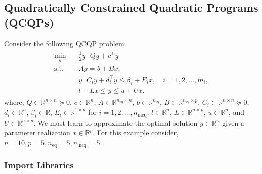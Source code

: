 \documentclass[letterpaper,10pt,english,openany,oneside]{sphinxmanual}
\begin{document}
\sphinxstepscope


\subsection{Quadratically Constrained Quadratic Programs (QCQPs)}
\label{\detokenize{examples/02_Example_QCQP:quadratically-constrained-quadratic-programs-qcqps}}\label{\detokenize{examples/02_Example_QCQP::doc}}
\sphinxAtStartPar
Consider the following QCQP problem:
\begin{equation*}
\begin{split}\begin{aligned}
\min_{y} \quad & \frac{1}{2} y^\top Q y + c^\top y \\
\text{s.t.} \quad
& A y = b + B x, \\
& y^\top C_i y + d_i^\top y \leq \beta_i + E_i x, \quad i = 1, 2, \ldots, m_i, \\
& l + L x \leq y \leq u + U x.
\end{aligned}\end{split}
\end{equation*}
\sphinxAtStartPar
where, \(Q \in \mathbb{R}^{n \times n} \succeq 0\), \(c \in \mathbb{R}^n\), \(A \in \mathbb{R}^{n_{\mathrm{eq}} \times n}\), \(b \in \mathbb{R}^{n_{\mathrm{eq}}}\), \(B \in \mathbb{R}^{n_{\mathrm{eq}} \times p }\), \(C_i \in \mathbb{R}^{n \times n} \succeq 0\), \(d_i \in \mathbb{R}^n\), \(\beta_i \in \mathbb{R}\), \(E_i \in \mathbb{R}^{1 \times p}\) for \(i = 1, 2, \ldots, n_{\mathrm{ineq}}\), \(l \in \mathbb{R}^n\), \(L \in \mathbb{R}^{n \times p}\), \(u \in \mathbb{R}^n\), and \(U \in \mathbb{R}^{n \times p}\). We must learn to approximate the optimal solution \(y \in \mathbb{R}^n\) given a parameter realization \(x \in \mathbb{R}^p\). For this example consider, \(n=10, p=5,n_\textrm{eq}=5,n_\textrm{ineq}=5\).


\subsubsection{Import Libraries}
\label{\detokenize{examples/02_Example_QCQP:import-libraries}}
\begin{sphinxVerbatim}[commandchars=\\\{\}]
 
\end{sphinxVerbatim}
\end{document}
